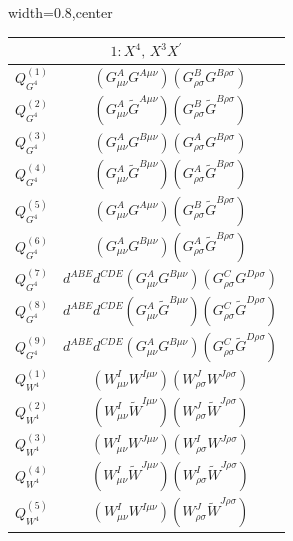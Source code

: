 \begin{table}[H]
\begin{center}
\begin{adjustbox}{width=0.8\textwidth,center}
\small
\begin{minipage}[t]{6cm}
\renewcommand{\arraystretch}{1.5}
\begin{tabular}[t]{c|c}
\multicolumn{2}{c}{\boldmath$1:X^4,\, X^3 X^{\prime}$} \\
\hline
$Q_{G^4}^{(1)}$  &  $(G_{\mu\nu}^A G^{A\mu\nu}) (G_{\rho\sigma}^B G^{B\rho\sigma})$ \\
%
$Q_{G^4}^{(2)}$  &  $(G_{\mu\nu}^A \widetilde{G}^{A\mu\nu}) (G_{\rho\sigma}^B \widetilde{G}^{B\rho\sigma})$ \\
%
$Q_{G^4}^{(3)}$  &  $(G_{\mu\nu}^A G^{B\mu\nu}) (G_{\rho\sigma}^A G^{B\rho\sigma})$ \\
%
$Q_{G^4}^{(4)}$  &  $(G_{\mu\nu}^A \widetilde{G}^{B\mu\nu}) (G_{\rho\sigma}^A \widetilde{G}^{B\rho\sigma})$ \\
%
$Q_{G^4}^{(5)}$  &  $(G_{\mu\nu}^A G^{A\mu\nu}) (G_{\rho\sigma}^B \widetilde{G}^{B\rho\sigma})$ \\
%
$Q_{G^4}^{(6)}$  &  $(G_{\mu\nu}^A G^{B\mu\nu}) (G_{\rho\sigma}^A \widetilde{G}^{B\rho\sigma})$ \\
%
$Q_{G^4}^{(7)}$  &  $d^{ABE} d^{CDE} (G_{\mu\nu}^A G^{B\mu\nu}) (G_{\rho\sigma}^C G^{D\rho\sigma})$ \\
%
$Q_{G^4}^{(8)}$  &  $d^{ABE} d^{CDE} (G_{\mu\nu}^A \widetilde{G}^{B\mu\nu}) (G_{\rho\sigma}^C \widetilde{G}^{D\rho\sigma})$ \\
%
$Q_{G^4}^{(9)}$  &  $d^{ABE} d^{CDE} (G_{\mu\nu}^A G^{B\mu\nu}) (G_{\rho\sigma}^C \widetilde{G}^{D\rho\sigma})$ \\
%
$Q_{W^4}^{(1)}$  &  $(W_{\mu\nu}^I W^{I\mu\nu}) (W_{\rho\sigma}^J W^{J\rho\sigma})$ \\
%
$Q_{W^4}^{(2)}$  &  $(W_{\mu\nu}^I \widetilde{W}^{I\mu\nu}) (W_{\rho\sigma}^J \widetilde{W}^{J\rho\sigma})$ \\
%
$Q_{W^4}^{(3)}$  &  $(W_{\mu\nu}^I W^{J\mu\nu}) (W_{\rho\sigma}^I W^{J\rho\sigma})$ \\
%
$Q_{W^4}^{(4)}$  &  $(W_{\mu\nu}^I \widetilde{W}^{J\mu\nu}) (W_{\rho\sigma}^I \widetilde{W}^{J\rho\sigma})$ \\
%
$Q_{W^4}^{(5)}$  &  $(W_{\mu\nu}^I W^{I\mu\nu}) (W_{\rho\sigma}^J \widetilde{W}^{J\rho\sigma})$ \\

\end{tabular}
\end{minipage}
\end{adjustbox}
\end{center}
\end{table}
